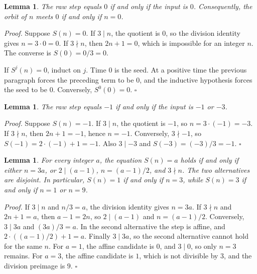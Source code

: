 \documentclass[11pt,letterpaper]{article}
\newtheorem{lemma}[theorem]{Lemma}
\newenvironment{proof}{\noindent\textit{Proof.}}{\hfill\(\square\)}
\begin{document}
\begin{lemma}
\label{lem:onlyzero}
The raw step equals \(0\) if and only if the input is \(0\). Consequently, the orbit of \(n\) meets \(0\) if and only if \(n=0\).
\end{lemma}

\begin{proof}
Suppose \(S(n)=0\). If \(3\mid n\), the quotient is \(0\), so the division identity gives \(n=3\cdot 0=0\). If \(3\nmid n\), then \(2n+1=0\), which is impossible for an integer \(n\). The converse is \(S(0)=0/3=0\).

If \(S^{j}(n)=0\), induct on \(j\). Time \(0\) is the seed. At a positive time the previous paragraph forces the preceding term to be \(0\), and the inductive hypothesis forces the seed to be \(0\). Conversely, \(S^{0}(0)=0\).
\end{proof}

\begin{lemma}
\label{lem:preimage}
The raw step equals \(-1\) if and only if the input is \(-1\) or \(-3\).
\end{lemma}

\begin{proof}
Suppose \(S(n)=-1\). If \(3\mid n\), the quotient is \(-1\), so \(n=3\cdot(-1)=-3\). If \(3\nmid n\), then \(2n+1=-1\), hence \(n=-1\). Conversely, \(3\nmid -1\), so \(S(-1)=2\cdot(-1)+1=-1\). Also \(3\mid -3\) and \(S(-3)=(-3)/3=-1\).
\end{proof}

\begin{lemma}
\label{lem:preimageall}
For every integer \(a\), the equation \(S(n)=a\) holds if and only if either \(n=3a\), or \(2\mid(a-1)\), \(n=(a-1)/2\), and \(3\nmid n\). The two alternatives are disjoint. In particular, \(S(n)=1\) if and only if \(n=3\), while \(S(n)=3\) if and only if \(n=1\) or \(n=9\).
\end{lemma}

\begin{proof}
If \(3\mid n\) and \(n/3=a\), the division identity gives \(n=3a\). If \(3\nmid n\) and \(2n+1=a\), then \(a-1=2n\), so \(2\mid(a-1)\) and \(n=(a-1)/2\). Conversely, \(3\mid 3a\) and \((3a)/3=a\). In the second alternative the step is affine, and \(2\cdot((a-1)/2)+1=a\). Finally \(3\mid 3a\), so the second alternative cannot hold for the same \(n\). For \(a=1\), the affine candidate is \(0\), and \(3\mid 0\), so only \(n=3\) remains. For \(a=3\), the affine candidate is \(1\), which is not divisible by \(3\), and the division preimage is \(9\).
\end{proof}
\end{document}
